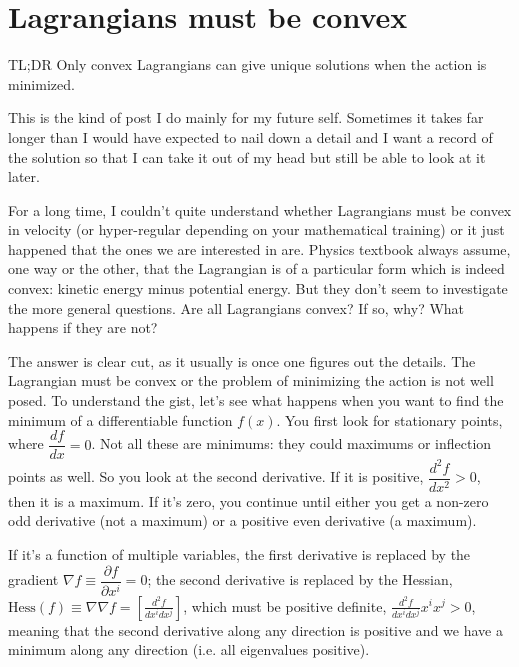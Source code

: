 \documentclass[aps,pra,10pt,floatfix,nofootinbib]{revtex4-1}
\theoremstyle{definition}
\begin{document}
	
\section{Lagrangians must be convex}

TL;DR Only convex Lagrangians can give unique solutions when the action is minimized.

This is the kind of post I do mainly for my future self. Sometimes it takes far longer than I would have expected to nail down a detail and I want a record of the solution so that I can take it out of my head but still be able to look at it later.

For a long time, I couldn't quite understand whether Lagrangians must be convex in velocity (or hyper-regular depending on your mathematical training) or it just happened that the ones we are interested in are. Physics textbook always assume, one way or the other, that the Lagrangian is of a particular form which is indeed convex: kinetic energy minus potential energy. But they don't seem to investigate the more general questions. Are all Lagrangians convex? If so, why? What happens if they are not?

The answer is clear cut, as it usually is once one figures out the details. The Lagrangian must be convex or the problem of minimizing the action is not well posed. To understand the gist, let's see what happens when you want to find the minimum of a differentiable function $f(x)$. You first look for stationary points, where $\dfrac{df}{dx} = 0$. Not all these are minimums: they could maximums or inflection points as well. So you look at the second derivative. If it is positive, $\dfrac{d^2f}{dx^2} > 0$, then it is a maximum. If it's zero, you continue until either you get a non-zero odd derivative (not a maximum) or a positive even derivative (a maximum).

If it's a function of multiple variables, the first derivative is replaced by the gradient $\nabla f \equiv \dfrac{\partial f}{\partial x^i} = 0$; the second derivative is replaced by the Hessian, $\textrm{Hess}(f) \equiv \nabla \nabla f = \left[\frac{d^2f}{dx^i dx^j}\right]$, which must be positive definite, $\frac{d^2f}{dx^i dx^j} x^i x^j > 0$, meaning that the second derivative along any direction is positive and we have a minimum along any direction (i.e. all eigenvalues positive).
\end{document}
